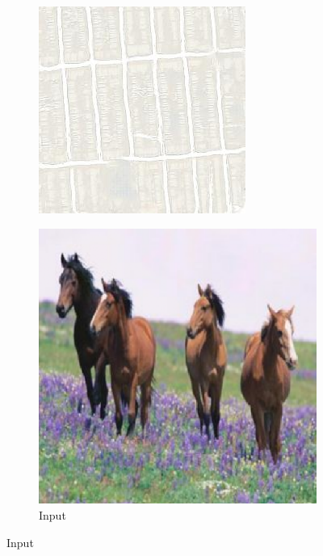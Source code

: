 \begin{figure}
\begin{subfigure}[t]{.2\textwidth}
    \includegraphics[width=\linewidth]{images/cycleGanResults/Maps10_Ld120_E100_Lr0002.jpg}
  \end{subfigure}
  \hfill
  \begin{subfigure}[t]{.2\textwidth}
    \caption{Input}
    \centering
    \includegraphics[width=\linewidth]{images/cycleGanResults/horse_input1.png}

\end{subfigure}
\end{figure}
